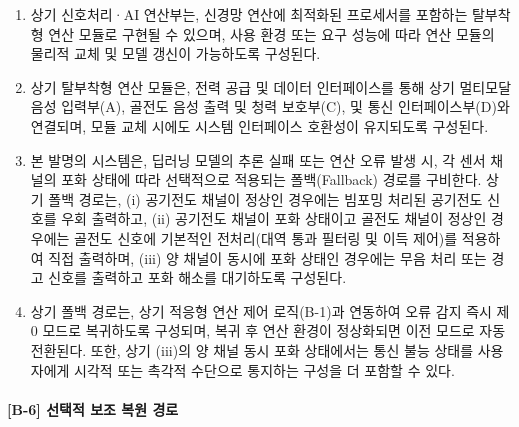 \documentclass{article}
\begin{document}
\begin{enumerate}[label = \textbf{(B.5.\arabic*)}]

    \item 상기 신호처리·AI 연산부는, 신경망 연산에 최적화된 프로세서를 포함하는 탈부착형 연산 모듈로 구현될 수 있으며, 사용 환경 또는 요구 성능에 따라 연산 모듈의 물리적 교체 및 모델 갱신이 가능하도록 구성된다.

    \item 상기 탈부착형 연산 모듈은, 전력 공급 및 데이터 인터페이스를 통해 상기 멀티모달 음성 입력부(A), 골전도 음성 출력 및 청력 보호부(C), 및 통신 인터페이스부(D)와 연결되며, 모듈 교체 시에도 시스템 인터페이스 호환성이 유지되도록 구성된다.

    \item 본 발명의 시스템은, 딥러닝 모델의 추론 실패 또는 연산 오류 발생 시, 각 센서 채널의 포화 상태에 따라 선택적으로 적용되는 폴백(Fallback) 경로를 구비한다. 상기 폴백 경로는, (i) 공기전도 채널이 정상인 경우에는 빔포밍 처리된 공기전도 신호를 우회 출력하고, (ii) 공기전도 채널이 포화 상태이고 골전도 채널이 정상인 경우에는 골전도 신호에 기본적인 전처리(대역 통과 필터링 및 이득 제어)를 적용하여 직접 출력하며, (iii) 양 채널이 동시에 포화 상태인 경우에는 무음 처리 또는 경고 신호를 출력하고 포화 해소를 대기하도록 구성된다.

    \item 상기 폴백 경로는, 상기 적응형 연산 제어 로직(B-1)과 연동하여 오류 감지 즉시 제0 모드로 복귀하도록 구성되며, 복귀 후 연산 환경이 정상화되면 이전 모드로 자동 전환된다. 또한, 상기 (iii)의 양 채널 동시 포화 상태에서는 통신 불능 상태를 사용자에게 시각적 또는 촉각적 수단으로 통지하는 구성을 더 포함할 수 있다.
\end{enumerate}


\paragraph{[B-6] 선택적 보조 복원 경로}
\end{document}
